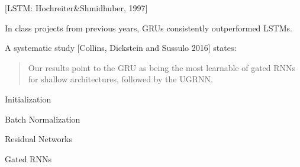{\centerline{\Large [LSTM: Hochreiter\&Shmidhuber, 1997]}


\vfill
In class projects from previous years, GRUs consistently outperformed LSTMs.

\vfill
A systematic study [Collins, Dickstein and Sussulo 2016] states:

\begin{quotation}
  Our results point to the GRU as being the most learnable of gated RNNs for shallow architectures, followed by the UGRNN.
\end{quotation}

\vfill
  \centerline{Initialization}
  \vfill
  \centerline{Batch Normalization}
  \vfill
  \centerline{Residual Networks}
  \vfill
  \centerline{Gated RNNs}


}

